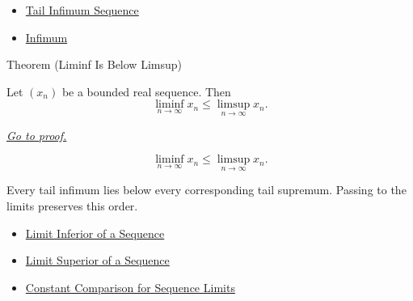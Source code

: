 \begin{dependencies}
\begin{itemize}
  \item \hyperref[def:tail-infimum-sequence]{Tail Infimum Sequence}
  \item \hyperref[def:infimum]{Infimum}
\end{itemize}
\end{dependencies}


\begin{theorembox}{Theorem (Liminf Is Below Limsup)}
\begin{theorem}
\label{thm:liminf-below-limsup}
Let $(x_n)$ be a bounded real sequence. Then
\[
  \liminf_{n\to\infty}x_n\le \limsup_{n\to\infty}x_n.
\]

\smallskip
\noindent
\hyperref[prf:liminf-below-limsup]{\textit{Go to proof.}}
\end{theorem}
\end{theorembox}

\begin{remark*}
\[
\liminf_{n\to\infty}x_n\le \limsup_{n\to\infty}x_n.
\]
\end{remark*}

\begin{remark*}[Interpretation]
Every tail infimum lies below every corresponding tail supremum. Passing to
the limits preserves this order.
\end{remark*}

\begin{dependencies}
\begin{itemize}
  \item \hyperref[def:liminf-sequence]{Limit Inferior of a Sequence}
  \item \hyperref[def:limsup-sequence]{Limit Superior of a Sequence}
  \item \hyperref[thm:constant-comparison-sequence-limits]{Constant Comparison for Sequence Limits}
\end{itemize}
\end{dependencies}



